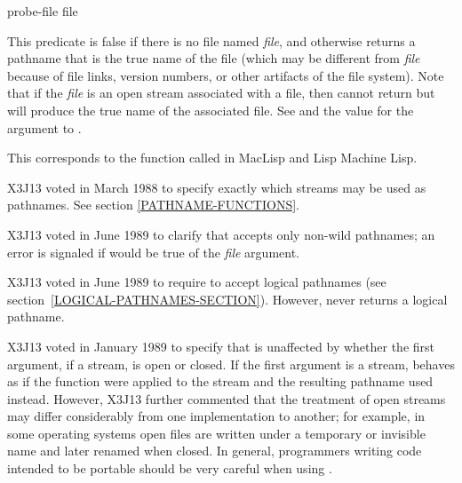 \begin{defun}[Function]
probe-file file

This predicate is false if there is no file named {\it file},
and otherwise returns a pathname that is the true name of the file
(which may be different from {\it file} because of file links, version
numbers, or other artifacts of the file system).
Note that if the {\it file} is an open stream associated with a file,
then  cannot return {\nil} but will produce the
true name of the associated file.
See  and the  value for the
 argument to .

\beforenoterule
\begin{incompatibility}
This corresponds to the function
called  in MacLisp and Lisp Machine Lisp.
\end{incompatibility}
\afternoterule

\begin{new}
X3J13 voted in March 1988
to specify exactly which streams may be used as pathnames.
See section \ref{PATHNAME-FUNCTIONS}.
\end{new}

\begin{newer}
X3J13 voted in June 1989 
to clarify that  accepts only non-wild pathnames;
an error is signaled if  would be true of
the {\it file} argument.
\end{newer}

\begin{newer}
X3J13 voted in June 1989  to require 
to accept logical pathnames (see section~\ref{LOGICAL-PATHNAMES-SECTION}).
However,  never returns a logical pathname.
\end{newer}

\begin{new}
X3J13 voted in January 1989
to specify that  is unaffected by
whether the first argument, if a stream, is open or closed. If the first
argument is a stream,  behaves as if the function 
were applied to the stream and the resulting pathname used instead.
However, X3J13 further commented that the treatment of open streams
may differ considerably from one implementation to another; for example,
in some operating systems open files are written under a temporary or
invisible name and later renamed when closed.  In general, programmers writing
code intended to be portable should be very careful when using .
\end{new}
\end{defun}

